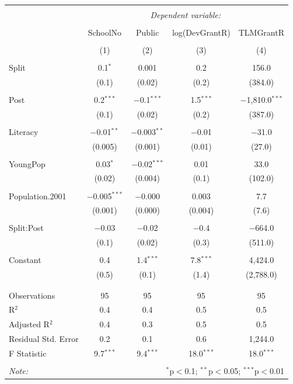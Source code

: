 \documentclass[12pt, a4paper]{article}
\begin{document}
\begin{table}[!htbp] \centering 
  \caption{} 
  \label{} 
\begin{tabular}{@{\extracolsep{5pt}}lcccc} 
\\[-1.8ex]\hline 
\hline \\[-1.8ex] 
 & \multicolumn{4}{c}{\textit{Dependent variable:}} \\ 
\cline{2-5} 
\\[-1.8ex] & SchoolNo & Public & log(DevGrantR) & TLMGrantR \\ 
\\[-1.8ex] & (1) & (2) & (3) & (4)\\ 
\hline \\[-1.8ex] 
 Split & 0.1$^{*}$ & 0.001 & 0.2 & 156.0 \\ 
  & (0.1) & (0.02) & (0.2) & (384.0) \\ 
  & & & & \\ 
 Post & 0.2$^{***}$ & $-$0.1$^{***}$ & 1.5$^{***}$ & $-$1,810.0$^{***}$ \\ 
  & (0.1) & (0.02) & (0.2) & (387.0) \\ 
  & & & & \\ 
 Literacy & $-$0.01$^{**}$ & $-$0.003$^{**}$ & $-$0.01 & $-$31.0 \\ 
  & (0.005) & (0.001) & (0.01) & (27.0) \\ 
  & & & & \\ 
 YoungPop & 0.03$^{*}$ & $-$0.02$^{***}$ & 0.01 & 33.0 \\ 
  & (0.02) & (0.004) & (0.1) & (102.0) \\ 
  & & & & \\ 
 Population.2001 & $-$0.005$^{***}$ & $-$0.000 & 0.003 & 7.7 \\ 
  & (0.001) & (0.000) & (0.004) & (7.6) \\ 
  & & & & \\ 
 Split:Post & $-$0.03 & $-$0.02 & $-$0.4 & $-$664.0 \\ 
  & (0.1) & (0.02) & (0.3) & (511.0) \\ 
  & & & & \\ 
 Constant & 0.4 & 1.4$^{***}$ & 7.8$^{***}$ & 4,424.0 \\ 
  & (0.5) & (0.1) & (1.4) & (2,788.0) \\ 
  & & & & \\ 
\hline \\[-1.8ex] 
Observations & 95 & 95 & 95 & 95 \\ 
R$^{2}$ & 0.4 & 0.4 & 0.5 & 0.5 \\ 
Adjusted R$^{2}$ & 0.4 & 0.3 & 0.5 & 0.5 \\ 
Residual Std. Error & 0.2 & 0.1 & 0.6 & 1,244.0 \\ 
F Statistic & 9.7$^{***}$ & 9.4$^{***}$ & 18.0$^{***}$ & 18.0$^{***}$ \\ 
\hline 
\hline \\[-1.8ex] 
\textit{Note:}  & \multicolumn{4}{r}{$^{*}$p$<$0.1; $^{**}$p$<$0.05; $^{***}$p$<$0.01} \\ 
\end{tabular} 
\end{table} %
\end{document}
